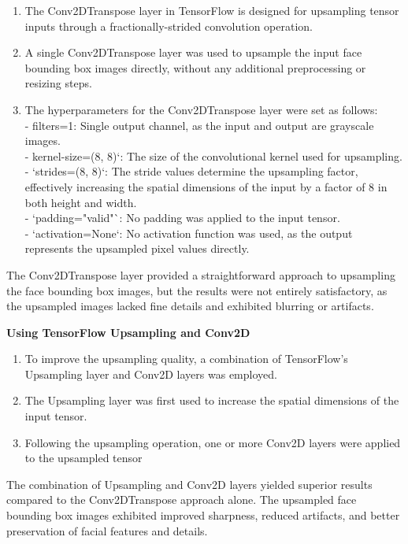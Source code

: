 \begin{enumerate}
    \item The Conv2DTranspose layer in TensorFlow is designed for upsampling tensor inputs through a fractionally-strided convolution operation.
    \item A single Conv2DTranspose layer was used to upsample the input face bounding box images directly, without any additional preprocessing or resizing steps.
    \item The hyperparameters for the Conv2DTranspose layer were set as follows:\\
        - filters=1: Single output channel, as the input and output are grayscale images.\\
        - kernel-size=(8, 8)`: The size of the convolutional kernel used for upsampling.\\
        - `strides=(8, 8)`: The stride values determine the upsampling factor, effectively increasing the spatial dimensions of the input by a factor of 8 in both height and width.\\
        - `padding="valid"`: No padding was applied to the input tensor.\\
        - `activation=None`: No activation function was used, as the output represents the upsampled pixel values directly.\\
\end{enumerate}

The Conv2DTranspose layer provided a straightforward approach to upsampling the face bounding box images, but the results were not entirely satisfactory, as the upsampled images lacked fine details and exhibited blurring or artifacts.

\textbf{Using TensorFlow Upsampling and Conv2D}

\begin{enumerate}
    \item To improve the upsampling quality, a combination of TensorFlow's Upsampling layer and Conv2D layers was employed.
    \item The Upsampling layer was first used to increase the spatial dimensions of the input tensor.
    \item Following the upsampling operation, one or more Conv2D layers were applied to the upsampled tensor
\end{enumerate}

The combination of Upsampling and Conv2D layers yielded superior results compared to the Conv2DTranspose approach alone. The upsampled face bounding box images exhibited improved sharpness, reduced artifacts, and better preservation of facial features and details.

